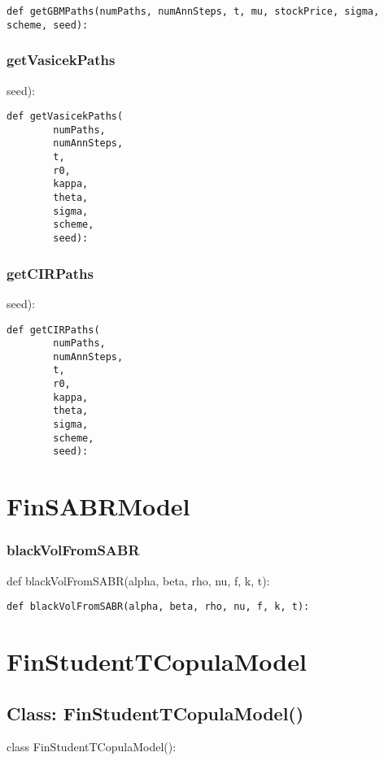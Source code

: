 \documentclass[twoside,11pt]{book}
\begin{document}
\begin{lstlisting}
def getGBMPaths(numPaths, numAnnSteps, t, mu, stockPrice, sigma, scheme, seed):
\end{lstlisting}

\subsubsection*{{\bf getVasicekPaths}}
seed): 

\begin{lstlisting}
def getVasicekPaths(
        numPaths,
        numAnnSteps,
        t,
        r0,
        kappa,
        theta,
        sigma,
        scheme,
        seed):
\end{lstlisting}

\subsubsection*{{\bf getCIRPaths}}
seed): 

\begin{lstlisting}
def getCIRPaths(
        numPaths,
        numAnnSteps,
        t,
        r0,
        kappa,
        theta,
        sigma,
        scheme,
        seed):
\end{lstlisting}

\newpage
\section{FinSABRModel}

\subsubsection*{{\bf blackVolFromSABR}}
def blackVolFromSABR(alpha, beta, rho, nu, f, k, t): 

\begin{lstlisting}
def blackVolFromSABR(alpha, beta, rho, nu, f, k, t):
\end{lstlisting}

\newpage
\section{FinStudentTCopulaModel}

\subsection*{Class: FinStudentTCopulaModel()}
class FinStudentTCopulaModel(): 
\end{document}
